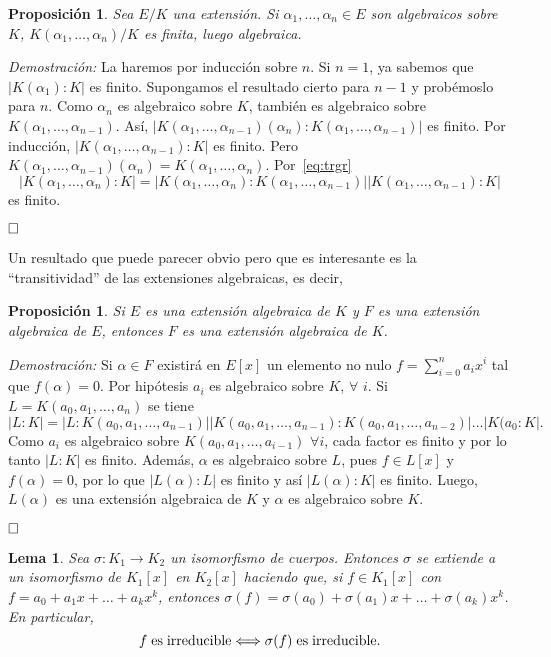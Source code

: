 \documentclass[12pt]{article}
\newtheorem{proposition}[theorem]{Proposición}
\newtheorem{lemma}{Lema}[theorem]
\begin{document}
\begin{proposition}\label{eq:finalg} Sea $E/K$ una extensión. Si $\alpha_{1}, \ldots, \alpha_{n} \in E$ son algebraicos sobre $K$, $K(\alpha_{1}, \ldots, \alpha_{n})/K$ es finita, luego algebraica.
\end{proposition}
\emph{Demostración: } La haremos por inducción sobre $n$. Si $n = 1$, ya sabemos que $|K(\alpha_{1}):K|$ es finito. Supongamos el resultado cierto para $n-1$ y probémoslo para $n$. Como $\alpha_{n}$ es algebraico sobre $K$, también es algebraico sobre $K(\alpha_{1}, \ldots, \alpha_{n-1})$. Así, $|K(\alpha_{1}, \ldots, \alpha_{n-1}) (\alpha_{n}) : K(\alpha_{1}, \ldots, \alpha_{n-1})|$ es finito. Por inducción, $|K(\alpha_{1}, \ldots, \alpha_{n-1}) : K|$ es finito. Pero $K(\alpha_{1}, \ldots, \alpha_{n-1}) (\alpha_{n}) = K(\alpha_{1}, \ldots, \alpha_{n})$. Por~\ref{eq:trgr} $$|K(\alpha_{1}, \ldots, \alpha_{n}) : K| = |K(\alpha_{1}, \ldots, \alpha_{n}) : K(\alpha_{1}, \ldots, \alpha_{n-1})| |K(\alpha_{1}, \ldots, \alpha_{n-1}) : K|$$ es finito.

$\hfill \square$

Un resultado que puede parecer obvio pero que es interesante es la “transitividad” de las extensiones algebraicas, es decir, 

\begin{proposition}Si $E$ es una extensión algebraica de $K$ y $F$ es una extensión algebraica de $E$, entonces $F$ es una extensión algebraica de $K$.
\end{proposition}
\emph{Demostración: } Si $\alpha \in F$ existirá en $E[x]$ un elemento no nulo $f = \sum _{i=0}^{n} a_{i}x^{i}$ tal que $f(\alpha)= 0$. Por hipótesis $a_{i}$ es algebraico sobre $K$, $\forall$ $i$. Si $L = K(a_{0}, a_{1}, \ldots, a_{n})$ se tiene $$|L : K| = |L:K(a_{0}, a_{1}, \ldots, a_{n-1})| |K(a_{0}, a_{1}, \ldots, a_{n-1}):K(a_{0}, a_{1}, \ldots, a_{n-2})| \ldots |K(a_{0}:K|.$$ Como $a_{i}$ es algebraico sobre $K(a_{0}, a_{1}, \ldots, a_{i-1})$ $\forall i$, cada factor es finito y por lo tanto $|L:K|$ es finito. Además, $\alpha$ es algebraico sobre $L$, pues $f \in L[x]$ y $f(\alpha) = 0$, por lo que $|L(\alpha):L|$ es finito y así $|L(\alpha) : K|$ es finito. Luego, $L(\alpha)$ es una extensión algebraica de $K$ y $\alpha$ es algebraico sobre $K$.

$\hfill \square$


\begin{lemma}Sea $\sigma \colon K_{1} \longrightarrow K_{2}$ un isomorfismo de cuerpos. Entonces $\sigma$ se extiende a un isomorfismo de $K_{1}[x]$ en $K_{2}[x]$ haciendo que, si $f \in K_{1}[x]$ con $f = a_{0} + a_{1}x + \ldots + a_{k}x^{k}$, entonces  $\sigma (f) =  \sigma(a_{0}) + \sigma( a_{1})x + \ldots + \sigma(a_{k})x^{k}$. En particular, $$f \hspace{0.1cm} \text{es} \hspace{0.1cm} \text{irreducible} \Longleftrightarrow \sigma (f) \hspace{0.1cm} \text{es} \hspace{0.1cm} \text{irreducible}.$$
\end{lemma}
\end{document}
